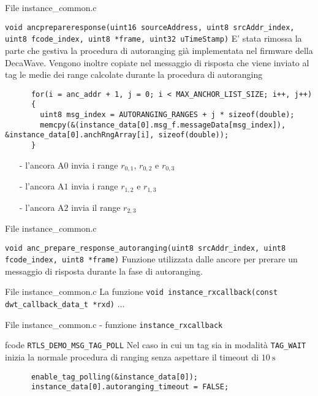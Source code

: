 \begin{frame}[fragile,shrink=20]{File instance\_common.c}
  \begin{block}{\lstinline!void ancprepareresponse(uint16 sourceAddress, uint8 srcAddr_index, uint8 fcode_index, uint8 *frame, uint32 uTimeStamp)!}
    E' stata rimossa la parte che gestiva la procedura di autoranging già implementata nel firmware della DecaWave. Vengono inoltre copiate nel messaggio
    di risposta che viene inviato al tag le medie dei range calcolate durante la procedura di autoranging
    \begin{lstlisting}
      for(i = anc_addr + 1, j = 0; i < MAX_ANCHOR_LIST_SIZE; i++, j++)
      {
        uint8 msg_index = AUTORANGING_RANGES + j * sizeof(double);
        memcpy(&(instance_data[0].msg_f.messageData[msg_index]), &instance_data[0].anchRngArray[i], sizeof(double));
      }
    \end{lstlisting}
    \begin{itemize}
    \item[-] l'ancora A$0$ invia i range $r_{0,1}$, $r_{0,2}$ e $r_{0,3}$
    \item[-] l'ancora A$1$ invia i range $r_{1,2}$ e $r_{1,3}$
    \item[-] l'ancora A$2$ invia il range $r_{2,3}$
    \end{itemize}
  \end{block}
\end{frame}

\begin{frame}{File instance\_common.c}
  \begin{block}{\lstinline!void anc_prepare_response_autoranging(uint8 srcAddr_index, uint8 fcode_index, uint8 *frame)!}
    Funzione utilizzata dalle ancore per prerare un messaggio di risposta durante la fase di autoranging.
  \end{block}
\end{frame}

\begin{frame}{File instance\_common.c}
  La funzione \lstinline!void instance_rxcallback(const dwt_callback_data_t *rxd)! ...
\end{frame}

\begin{frame}[fragile]{File instance\_common.c - funzione \lstinline!instance_rxcallback!}
  \begin{block}{fcode \lstinline!RTLS_DEMO_MSG_TAG_POLL!}
    Nel caso in cui un tag sia in modalità \lstinline!TAG_WAIT! inizia la normale procedura di ranging senza aspettare il timeout di $\SI{10}{\second}$
    \begin{lstlisting}
      enable_tag_polling(&instance_data[0]);
      instance_data[0].autoranging_timeout = FALSE;
    \end{lstlisting}
  \end{block}
\end{frame}

